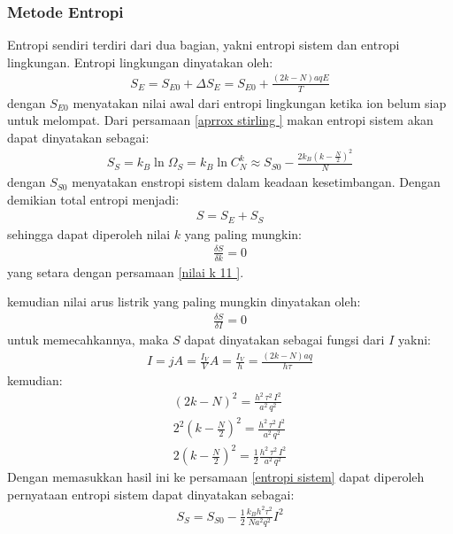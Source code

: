 \documentclass[t]{beamer}
\begin{document}
\begin{frame}
\frametitle{Metode Entropi}
Entropi sendiri terdiri dari dua bagian, yakni entropi sistem dan entropi lingkungan. Entropi lingkungan dinyatakan oleh:
\begin{align}
S_E  =  S_{E0 }  + \Delta S_E   = S_{E0}  + \frac{(2 k -N) aqE}{T}
\end{align}
dengan $S_{E0} $  menyatakan nilai awal dari entropi lingkungan  ketika ion belum siap untuk melompat. Dari  persamaan \ref{aprrox stirling	} makan entropi sistem akan dapat dinyatakan sebagai:
\begin{align}
S_S  =  k_B \ln  \Omega_S =  k_B \ln C_N^k  \approx  S_{S0}  - \frac{2 k_B ( k - \frac{N}{2})^2}{N}  \label{entropi sistem}
\end{align}
dengan $S_{S0}$ menyatakan enstropi sistem dalam keadaan kesetimbangan.  Dengan demikian total entropi menjadi:
\begin{align}
S = S_E + S_S 
\end{align}
sehingga dapat diperoleh nilai $k$ yang paling mungkin:
\begin{align}
\frac{\delta S}{\delta k} = 0 
\end{align}
yang setara dengan persamaan \ref*{nilai k 11 }. 
\end{frame}

\begin{frame}
kemudian nilai arus listrik yang paling mungkin dinyatakan oleh:
\begin{align}
\frac{\delta S}{\delta I} =  0 
\end{align}
untuk memecahkannya, maka $S$ dapat dinyatakan sebagai fungsi dari $I$ yakni:
\begin{align}
	I = j A =  \frac{I_V}{V} A = \frac{I_V}{h}  = \frac{(2k - N) aq}{h \tau }
\end{align}
kemudian:
\begin{align}
(2 k - N)^2  = \frac{h^2 \, \tau^2 \, I^2 }{a^2\, q^2}  \nonumber \\
2^2 \left( k - \frac{N}{2}\right)^2 = \frac{h^2 \, \tau^2 \, I^2 }{a^2\, q^2}  \nonumber \\
2 \left( k - \frac{N}{2}\right)^2 = \frac{1}{2} \frac{h^2 \, \tau^2 \, I^2 }{a^2\, q^2}
\end{align}
Dengan memasukkan hasil ini ke persamaan \ref{entropi sistem} dapat diperoleh pernyataan entropi sistem dapat dinyatakan  sebagai:
\begin{align}
S_S = S_{S0}  - \frac{1}{2} \frac{k_B  h^2  \tau^2 }{Na^2  q^2 } I^2 
\end{align}
\end{frame}
\end{document}
